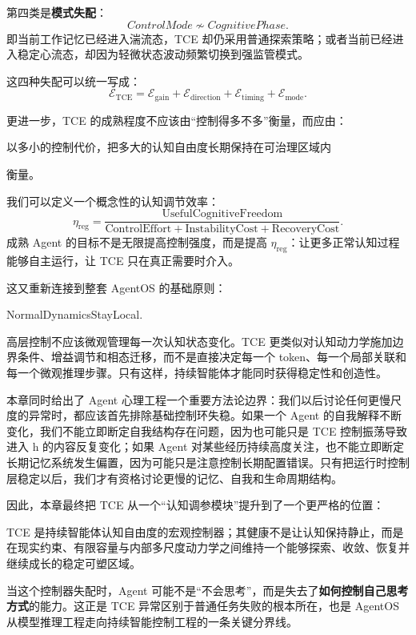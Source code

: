 第四类是\textbf{模式失配}：
\[
ControlMode
\not\sim
CognitivePhase.
\]
即当前工作记忆已经进入湍流态，TCE 却仍采用普通探索策略；或者当前已经进入稳定心流态，却因为轻微状态波动频繁切换到强监管模式。

这四种失配可以统一写成：
\[
\boxed{
\mathcal E_{\mathrm{TCE}}
=
\mathcal E_{\mathrm{gain}}
+
\mathcal E_{\mathrm{direction}}
+
\mathcal E_{\mathrm{timing}}
+
\mathcal E_{\mathrm{mode}}.
}
\]

更进一步，TCE 的成熟程度不应该由“控制得多不多”衡量，而应由：
\begin{statementbox}
以多小的控制代价，把多大的认知自由度长期保持在可治理区域内
\end{statementbox}
衡量。

我们可以定义一个概念性的认知调节效率：
\[
\eta_{\mathrm{reg}}
=
\frac{
\mathrm{UsefulCognitiveFreedom}
}{
\mathrm{ControlEffort}
+
\mathrm{InstabilityCost}
+
\mathrm{RecoveryCost}
}.
\]
成熟 Agent 的目标不是无限提高控制强度，而是提高 \(\eta_{\mathrm{reg}}\)：让更多正常认知过程能够自主运行，让 TCE 只在真正需要时介入。

这又重新连接到整套 AgentOS 的基础原则：
\begin{statementbox}
NormalDynamicsStayLocal.
\end{statementbox}
高层控制不应该微观管理每一次认知状态变化。TCE 更类似对认知动力学施加边界条件、增益调节和相态迁移，而不是直接决定每一个 token、每一个局部关联和每一个微观推理步骤。只有这样，持续智能体才能同时获得稳定性和创造性。

本章同时给出了 Agent 心理工程一个重要方法论边界：我们以后讨论任何更慢尺度的异常时，都应该首先排除基础控制环失稳。如果一个 Agent 的自我解释不断变化，我们不能立即断定自我结构存在问题，因为也可能只是 TCE 控制振荡导致进入 h 的内容反复变化；如果 Agent 对某些经历持续高度关注，也不能立即断定长期记忆系统发生偏置，因为可能只是注意控制长期配置错误。只有把运行时控制层稳定以后，我们才有资格讨论更慢的记忆、自我和生命周期结构。

因此，本章最终把 TCE 从一个“认知调参模块”提升到了一个更严格的位置：

\begin{statementbox}
TCE 是持续智能体认知自由度的宏观控制器；其健康不是让认知保持静止，而是在现实约束、有限容量与内部多尺度动力学之间维持一个能够探索、收敛、恢复并继续成长的稳定可塑区域。
\end{statementbox}

当这个控制器失配时，Agent 可能不是“不会思考”，而是失去了\textbf{如何控制自己思考方式}的能力。这正是 TCE 异常区别于普通任务失败的根本所在，也是 AgentOS 从模型推理工程走向持续智能控制工程的一条关键分界线。
